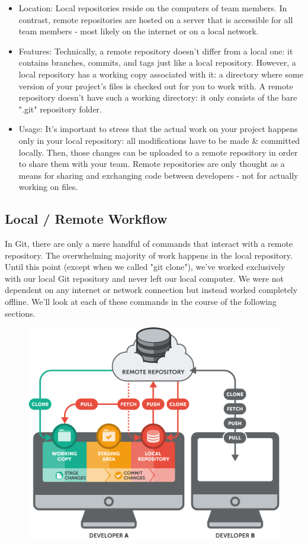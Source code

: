 \documentclass{article}
\begin{document}
\begin{itemize}
    \item Location: Local repositories reside on the computers of team members. In contrast, remote repositories are hosted on a server that is accessible for all team members - most likely on the internet or on a local network.
    \item Features: Technically, a remote repository doesn't differ from a local one: it contains branches, commits, and tags just like a local repository. However, a local repository has a working copy associated with it: a directory where some version of your project's files is checked out for you to work with. A remote repository doesn't have such a working directory: it only consists of the bare ".git" repository folder.
    \item  Usage: It's important to stress that the actual work on your project happens only in your local repository: all modifications have to be made \& committed locally. Then, those changes can be uploaded to a remote repository in order to share them with your team. Remote repositories are only thought as a means for sharing and exchanging code between developers - not for actually working on files.
\end{itemize}

\subsection{Local / Remote Workflow}
In Git, there are only a mere handful of commands that interact with a remote repository.
\newline\newline
The overwhelming majority of work happens in the local repository. Until this point (except when we called "git clone"), we've worked exclusively with our local Git repository and never left our local computer. We were not dependent on any internet or network connection but instead worked completely offline.
\newline\newline
We'll look at each of these commands in the course of the following sections.
\begin{figure}[h]
    \centering
    \includegraphics[width=4.5in]{images/basic-remote-workflow.png}
\end{figure}
\end{document}
